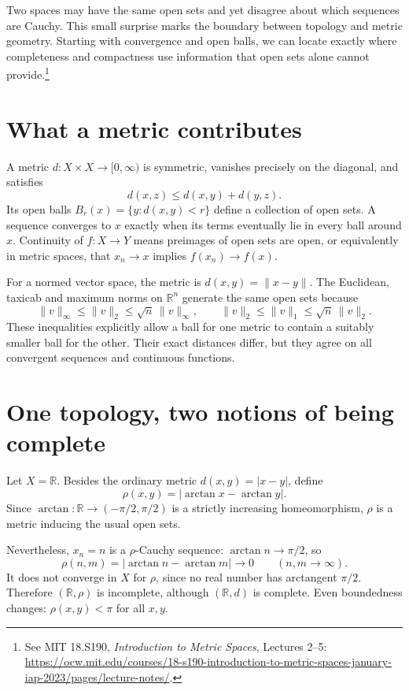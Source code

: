 
Two spaces may have the same open sets and yet disagree about which sequences are Cauchy. This small surprise marks the boundary between topology and metric geometry. Starting with convergence and open balls, we can locate exactly where completeness and compactness use information that open sets alone cannot provide.\footnote{See MIT 18.S190, \emph{Introduction to Metric Spaces}, Lectures 2--5: \url{https://ocw.mit.edu/courses/18-s190-introduction-to-metric-spaces-january-iap-2023/pages/lecture-notes/}.}

\section{What a metric contributes}

A metric \(d:X\times X\to[0,\infty)\) is symmetric, vanishes precisely on the diagonal, and satisfies
\[
 d(x,z)\le d(x,y)+d(y,z).
\]
Its open balls \(B_r(x)=\{y:d(x,y)<r\}\) define a collection of open sets. A sequence converges to \(x\) exactly when its terms eventually lie in every ball around \(x\). Continuity of \(f:X\to Y\) means preimages of open sets are open, or equivalently in metric spaces, that \(x_n\to x\) implies \(f(x_n)\to f(x)\).

For a normed vector space, the metric is \(d(x,y)=\|x-y\|\). The Euclidean, taxicab and maximum norms on \(\mathbb R^n\) generate the same open sets because
\[
 \|v\|_\infty\le\|v\|_2\le\sqrt n\,\|v\|_\infty,
 \qquad \|v\|_2\le\|v\|_1\le\sqrt n\,\|v\|_2.
\]
These inequalities explicitly allow a ball for one metric to contain a suitably smaller ball for the other. Their exact distances differ, but they agree on all convergent sequences and continuous functions.

\section{One topology, two notions of being complete}

Let \(X=\mathbb R\). Besides the ordinary metric \(d(x,y)=|x-y|\), define
\[
 \rho(x,y)=|\arctan x-\arctan y|.
\]
Since \(\arctan:\mathbb R\to(-\pi/2,\pi/2)\) is a strictly increasing homeomorphism, \(\rho\) is a metric inducing the usual open sets.

Nevertheless, \(x_n=n\) is a \(\rho\)-Cauchy sequence: \(\arctan n\to\pi/2\), so
\[
 \rho(n,m)=|\arctan n-\arctan m|\longrightarrow0
 \qquad(n,m\to\infty).
\]
It does not converge in \(X\) for \(\rho\), since no real number has arctangent \(\pi/2\). Therefore \((\mathbb R,\rho)\) is incomplete, although \((\mathbb R,d)\) is complete. Even boundedness changes: \(\rho(x,y)<\pi\) for all \(x,y\).

